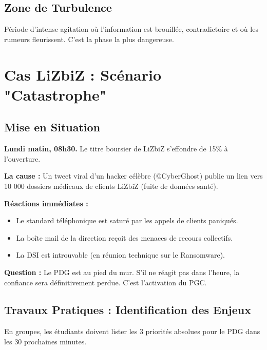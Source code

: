 \subsection{Zone de Turbulence}

Période d'intense agitation où l'information est brouillée, contradictoire et où les rumeurs fleurissent. C'est la phase la plus dangereuse.

\section{Cas LiZbiZ : Scénario "Catastrophe"}

\subsection{Mise en Situation}

\begin{boxlizbiz}
\textbf{Lundi matin, 08h30.}
Le titre boursier de LiZbiZ s'effondre de 15\% à l'ouverture.

\textbf{La cause :} Un tweet viral d'un hacker célèbre (@CyberGhost) publie un lien vers 10 000 dossiers médicaux de clients LiZbiZ (fuite de données santé).

\textbf{Réactions immédiates :}
\begin{itemize}
    \item Le standard téléphonique est saturé par les appels de clients paniqués.
    \item La boîte mail de la direction reçoit des menaces de recours collectifs.
    \item La DSI est introuvable (en réunion technique sur le Ransomware).
\end{itemize}

\textbf{Question :} Le PDG est au pied du mur. S'il ne réagit pas dans l'heure, la confiance sera définitivement perdue. C'est l'activation du PGC.
\end{boxlizbiz}

\subsection{Travaux Pratiques : Identification des Enjeux}

En groupes, les étudiants doivent lister les 3 priorités absolues pour le PDG dans les 30 prochaines minutes.

